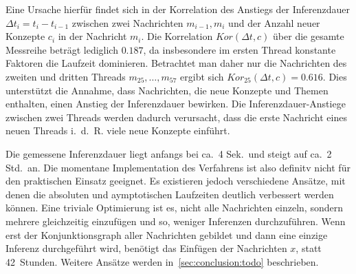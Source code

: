 Eine Ursache hierfür findet sich in der Korrelation des Anstiegs der Inferenzdauer $\Delta t_i = t_i - t_{i - 1}$ zwischen zwei Nachrichten $m_{i - 1}, m_i$ und der Anzahl neuer Konzepte $c_i$ in der Nachricht $m_i$.
Die Korrelation $Kor(\Delta t, c)$ über die gesamte Messreihe beträgt lediglich $0.187$, da insbesondere im ersten Thread konstante Faktoren die Laufzeit dominieren.
Betrachtet man daher nur die Nachrichten des zweiten und dritten Threads $m_{25}, \dots, m_{57}$ ergibt sich $Kor_{25}(\Delta t, c) = 0.616$.
Dies unterstützt die Annahme, dass Nachrichten, die neue Konzepte und Themen enthalten, einen Anstieg der Inferenzdauer bewirken.
Die Inferenzdauer-Anstiege zwischen zwei Threads werden dadurch verursacht, dass die erste Nachricht eines neuen Threads i.~d.~R. viele neue Konzepte einführt.

Die gemessene Inferenzdauer liegt anfangs bei ca.\ 4 Sek.\ und steigt auf ca.\ 2 Std.\ an.
Die momentane Implementation des Verfahrens ist also definitv nicht für den praktischen Einsatz geeignet.
Es existieren jedoch verschiedene Ansätze, mit denen die absoluten und aymptotischen Laufzeiten deutlich verbessert werden können.
Eine triviale Optimierung ist es, nicht alle Nachrichten einzeln, sondern mehrere gleichzeitig einzufügen und so, weniger Inferenzen durchzuführen.
Wenn erst der Konjunktionsgraph aller Nachrichten gebildet und dann eine einzige Inferenz durchgeführt wird, benötigt das Einfügen der Nachrichten $x$, statt 42~Stunden.
Weitere Ansätze werden in~\ref{sec:conclusion:todo} beschrieben.
